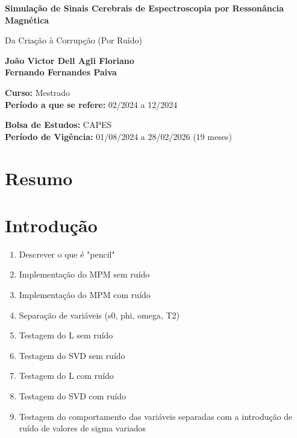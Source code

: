 \documentclass[12pt]{article}
\begin{document}
\begin{titlepage}
    \begin{center}
        \vspace*{1cm}
            
        \Huge
        \textbf{Simulação de Sinais Cerebrais de Espectroscopia por 
        Ressonância Magnética}
            
        \vspace{0.5cm}
        \LARGE
        Da Criação à Corrupção (Por Ruído)
            
        \vspace{1.5cm}
            
        \textbf{João Victor Dell Agli Floriano \\ Fernando Fernandes Paiva}

            
        \vfill
            
        \textbf{Curso:} Mestrado \\
        \textbf{Período a que se refere:} 02/2024 a 12/2024
            
        \vspace{0.8cm}
            
        \Large
        \textbf{Bolsa de Estudos:} CAPES \\
        \textbf{Período de Vigência:} 01/08/2024 a 28/02/2026 (19 meses)
            
    \end{center}
\end{titlepage}


\section{Resumo}

\section{Introdução}

\begin{enumerate}
    \item Descrever o que é "pencil"
    \item Implementação do MPM sem ruído
    \item Implementação do MPM com ruído
    \item Separação de variáveis (s0, phi, omega, T2)
    \item Testagem do L sem ruído
    \item Testagem do SVD sem ruído
    \item Testagem do L com ruído
    \item Testagem do SVD com ruído
    \item Testagem do comportamento das variáveis separadas com a introdução de ruído de valores de sigma variados
\end{enumerate}
\end{document}
